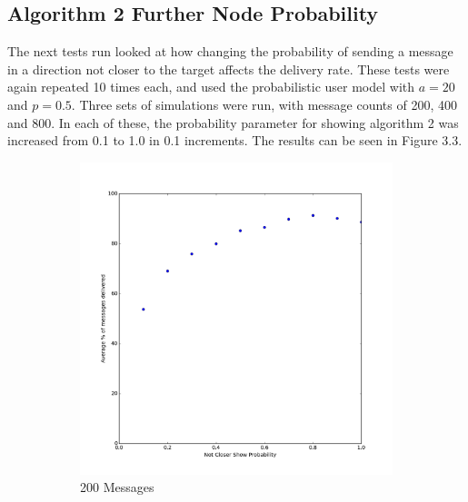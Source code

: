 \documentclass[bsc,frontabs,twoside,singlespacing,parskip,deptreport]{infthesis}     %
\begin{document}
\subsection{Algorithm 2 Further Node Probability}
The next tests run looked at how changing the probability of sending a message in a direction not closer to the target affects the delivery rate. These tests were again repeated 10 times each, and used the probabilistic user model with $a = 20$ and $p = 0.5$. Three sets of simulations were run, with message counts of 200, 400 and 800. In each of these, the probability parameter for showing algorithm 2 was increased from 0.1 to 1.0 in 0.1 increments. The results can be seen in Figure 3.3.

\begin{figure}[h]
  	\vspace{-10pt}
    \centering
    \begin{subfigure}[b]{0.3\textwidth}
        \includegraphics[width=\textwidth]{results/notCloserProb_200messages}
        \caption{200 Messages}
        \label{fig:results/notCloserProb_200messages}
    \end{subfigure}
    ~ %
    \begin{subfigure}[b]{0.3\textwidth}

\end{subfigure}
\end{figure}
\end{document}
